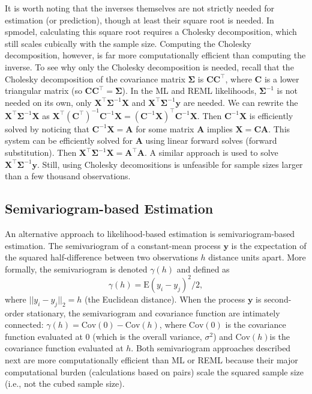 \documentclass{article}
\begin{document}
It is worth noting that the inverses themselves are not strictly needed
for estimation (or prediction), though at least their square root is
needed. In spmodel, calculating this square root requires a Cholesky
decomposition, which still scales cubically with the sample size.
Computing the Cholesky decomposition, however, is far more
computationally efficient than computing the inverse. To see why only
the Cholesky decomposition is needed, recall that the Cholesky
decomposition of the covariance matrix \(\mathbf{\Sigma}\) is
\(\mathbf{C}\mathbf{C}^\intercal\), where \(\mathbf{C}\) is a lower
triangular matrix (so
\(\mathbf{C}\mathbf{C}^\intercal = \mathbf{\Sigma}\)). In the ML and
REML likelihoods, \(\mathbf{\Sigma}^{-1}\) is not needed on its own,
only \(\mathbf{X}^\intercal \mathbf{\Sigma}^{-1} \mathbf{X}\) and
\(\mathbf{X}^\intercal \mathbf{\Sigma}^{-1} \mathbf{y}\) are needed. We
can rewrite the \(\mathbf{X}^\intercal \mathbf{\Sigma}^{-1} \mathbf{X}\)
as
\(\mathbf{X}^\intercal (\mathbf{C}^\intercal)^{-1} \mathbf{C}^{-1} \mathbf{X} = (\mathbf{C}^{-1} \mathbf{X})^\intercal \mathbf{C}^{-1} \mathbf{X}\).
Then \(\mathbf{C}^{-1} \mathbf{X}\) is efficiently solved by noticing
that \(\mathbf{C}^{-1} \mathbf{X} = \mathbf{A}\) for some matrix
\(\mathbf{A}\) implies \(\mathbf{X} = \mathbf{C} \mathbf{A}\). This
system can be efficiently solved for \(\mathbf{A}\) using linear forward
solves (forward substitution). Then
\(\mathbf{X}^\intercal \mathbf{\Sigma}^{-1} \mathbf{X} = \mathbf{A}^\intercal \mathbf{A}\).
A similar approach is used to solve
\(\mathbf{X}^\intercal \mathbf{\Sigma}^{-1} \mathbf{y}\). Still, using
Cholesky decomositions is unfeasible for sample sizes larger than a few
thousand observations.

\hypertarget{semivariogram-based-estimation}{%
\subsection{Semivariogram-based
Estimation}\label{semivariogram-based-estimation}}

An alternative approach to likelihood-based estimation is
semivariogram-based estimation. The semivariogram of a constant-mean
process \(\mathbf{y}\) is the expectation of the squared half-difference
between two observations \(h\) distance units apart. More formally, the
semivariogram is denoted \(\gamma(h)\) and defined as
\begin{equation}\label{eq:sv}
  \gamma(h) = \text{E}(y_i - y_j)^2 / 2 ,
\end{equation} where \(||y_i - y_j||_2 = h\) (the Euclidean distance).
When the process \(\mathbf{y}\) is second-order stationary, the
semivariogram and covariance function are intimately connected:
\(\gamma(h) = \text{Cov}(0) - \text{Cov}(h)\), where \(\text{Cov}(0)\)
is the covariance function evaluated at 0 (which is the overall
variance, \(\sigma^2\)) and \(\text{Cov}(h)\)is the covariance function
evaluated at \(h\). Both semivariogram approaches described next are
more computationally efficient than ML or REML because their major
computational burden (calculations based on pairs) scale the squared
sample size (i.e., not the cubed sample size).
\end{document}
